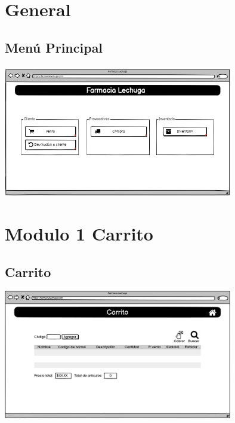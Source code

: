 \newpage
\begin{flushleft}
	\section{General}
	\subsection{Menú Principal} \label{UI: menu principal}
	\begin{center}
		\includegraphics[width=10cm]{pantallas/images/1menu.png}\\	
		 	
	\end{center}
	\newpage
	\section{Modulo 1 Carrito}
	\subsection{Carrito} \label{UI: carrito}
	\begin{center}
		\includegraphics[width=10cm]{pantallas/images/2carrito.png}\\	
		 	

\end{center}
\end{flushleft}
